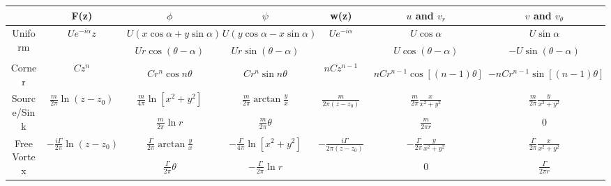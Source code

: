 \documentclass[11pt, letterpaper, notitlepage]{article}
\begin{document}
\begin{landscape}

\begin{tabular}{|c|c|c|c|c|c|c|}
\hline & F(z) & $\phi$ & $\psi$ & w(z) & $u$ and $v_r$ & $v$ and $v_{\theta}$ \\

\hline \multirow{2}{*}{Uniform}
  & \multirow{2}{*}{$U e^{-i \alpha} z$} %
    & $U(x \cos{\alpha}+y \sin{\alpha})$ %
    & $U(y \cos{\alpha}-x \sin{\alpha})$ %
  & \multirow{2}{*}{$U e^{-i \alpha}$} %
    & $U \cos{\alpha}$ %
    & $U \sin{\alpha}$ %
  \\ \cline{3-4} \cline{6-7} 
  & 
    & $U r \cos(\theta - \alpha)$ %
    & $U r \sin(\theta - \alpha)$ %
  & 
    & $U \cos(\theta - \alpha)$ %
    & $-U \sin(\theta - \alpha)$ %
\\

\hline \multirow{2}{*}{Corner}
  & \multirow{2}{*}{$C z^n$} %
    & %
    & %
  & \multirow{2}{*}{$n C z^{n-1}$} %
    & %
    & %
  \\ \cline{3-4} \cline{6-7} 
  & 
    & $C r^n \cos{n \theta}$ %
    & $C r^n \sin{n \theta}$ %
  & 
    & $n C r^{n-1} \cos[(n-1) \theta]$ %
    & $- n C r^{n-1} \sin[(n-1) \theta]$ %
\\

\hline \multirow{2}{*}{Source/Sink}
  & \multirow{2}{*}{$\frac{m}{2 \pi} \ln(z - z_0)$} %
    & $\frac{m}{4 \pi} \ln[{x^2+y^2}]$ %
    & $\frac{m}{2 \pi} \arctan{\frac{y}{x}}$ %
  & \multirow{2}{*}{$\frac{m}{2 \pi (z - z_0)}$} %
    & $\frac{m}{2 \pi} \frac{x}{x^2+y^2}$ %
    & $\frac{m}{2 \pi} \frac{y}{x^2+y^2}$ %
  \\ \cline{3-4} \cline{6-7} 
  & 
    & $\frac{m}{2 \pi} \ln{r}$ %
    & $\frac{m}{2 \pi} \theta$ %
  & 
    & $\frac{m}{2 \pi r}$ %
    & $0$ %
\\

\hline \multirow{2}{*}{Free Vortex} %
  & \multirow{2}{*}{$-\frac{i \Gamma}{2 \pi} \ln(z - z_0)$} %
    & $\frac{\Gamma}{2 \pi} \arctan{\frac{y}{x}}$ %
    & $-\frac{\Gamma}{4 \pi} \ln[x^2 + y^2]$ %
  & \multirow{2}{*}{$-\frac{i \Gamma}{2 \pi (z-z_0)}$} %
    & $-\frac{\Gamma}{2 \pi} \frac{y}{x^2 + y^2}$ %
    & $\frac{\Gamma}{2 \pi} \frac{x}{x^2 + y^2}$ %
  \\ \cline{3-4} \cline{6-7} 
  & 
    & $\frac{\Gamma}{2 \pi} \theta$ %
    & $-\frac{\Gamma}{2 \pi} \ln{r}$ %
  & 
    & $0$ %
    & $\frac{\Gamma}{2 \pi r}$ %
\\


\end{tabular}
\end{landscape}
\end{document}
